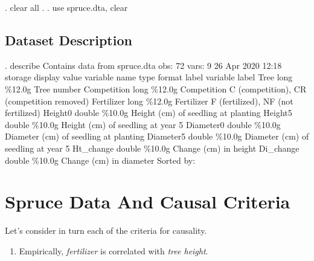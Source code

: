 \documentclass[
]{article}
\providecommand{\tightlist}{%
  \setlength{\itemsep}{0pt}\setlength{\parskip}{0pt}}
\begin{document}
\begin{stlog}
. clear all
{\smallskip}
.         
. use spruce.dta, clear
\end{stlog}

\hypertarget{dataset-description}{%
\subsection{Dataset Description}\label{dataset-description}}



\begin{stlog}
. describe    
{\smallskip}
Contains data from spruce.dta
  obs:            72                          
 vars:             9                          26 Apr 2020 12:18
              storage   display    value
variable name   type    format     label      variable label
Tree            long    \%12.0g                Tree number
Competition     long    \%12.0g     Competition
                                              C (competition), CR (competition
                                                removed)
Fertilizer      long    \%12.0g     Fertilizer
                                              F (fertilized), NF (not fertilized)
Height0         double  \%10.0g                Height (cm) of seedling at planting
Height5         double  \%10.0g                Height (cm) of seedling at year 5
Diameter0       double  \%10.0g                Diameter (cm) of seedling at planting
Diameter5       double  \%10.0g                Diameter (cm) of seedling at year 5
Ht_change       double  \%10.0g                Change (cm) in height
Di_change       double  \%10.0g                Change (cm) in diameter
Sorted by: 
\end{stlog}

\hypertarget{spruce-data-and-causal-criteria}{%
\section{Spruce Data And Causal Criteria
🌲}\label{spruce-data-and-causal-criteria}}

Let's consider in turn each of the criteria for causality.

\begin{enumerate}
\def\labelenumi{\arabic{enumi}.}
\tightlist
\item
  Empirically, \emph{fertilizer} is correlated with \emph{tree height}.
\end{enumerate}
\end{document}

